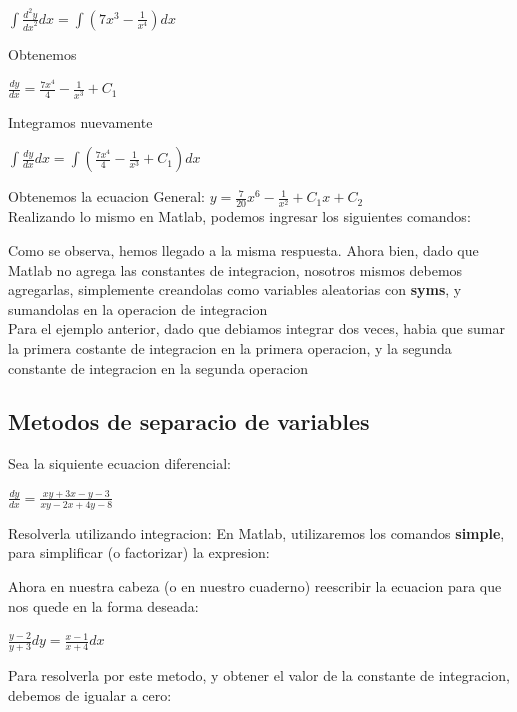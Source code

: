 \documentclass[10pt,a4paper]{article}
\begin{document}
\begin{center}
$\int \frac{d^2y}{{dx}^2}dx=\int (7x^3-\frac{1}{x^4})dx$
\end{center}

Obtenemos 
\begin{center}
 $\frac{dy}{dx}=\frac{7x^4}{4}-\frac{1}{x^3}+C_1$
\end{center}

Integramos nuevamente
\begin{center}
$\int \frac{dy}{dx}dx=\int (\frac{7x^4}{4}-\frac{1}{x^3}+C_1)dx$
\end{center}

Obtenemos la ecuacion General:
$y=\frac{7}{20}x^6-\frac{1}{x^2}+C_1x+C_2$
\\
Realizando lo mismo en Matlab, podemos ingresar los siguientes comandos:






Como se observa, hemos llegado a la misma respuesta. Ahora bien, dado que Matlab no agrega las constantes de integracion, nosotros mismos debemos agregarlas, simplemente creandolas como variables aleatorias con {\bf syms}, y sumandolas en la operacion de integracion
\\
Para el ejemplo anterior, dado que debiamos integrar dos veces, habia que sumar la primera costante de integracion en la primera operacion, y la segunda constante de integracion en la segunda operacion

\subsection*{Metodos de separacio de variables}
Sea la siquiente ecuacion diferencial:

\begin{center}
$\frac{dy}{dx}=\frac{xy+3x-y-3}{xy-2x+4y-8}$
\end{center}

Resolverla utilizando integracion: En Matlab, utilizaremos los comandos {\bf simple}, para simplificar (o factorizar) la expresion:

Ahora en nuestra cabeza (o en nuestro cuaderno) reescribir la ecuacion para que nos quede en la forma deseada:

\begin{center}
$\frac{y-2}{y+3}dy=\frac{x-1}{x+4}dx$
\end{center}

Para resolverla por este metodo, y obtener el valor de la constante de integracion, debemos de igualar a cero:
\end{document}
